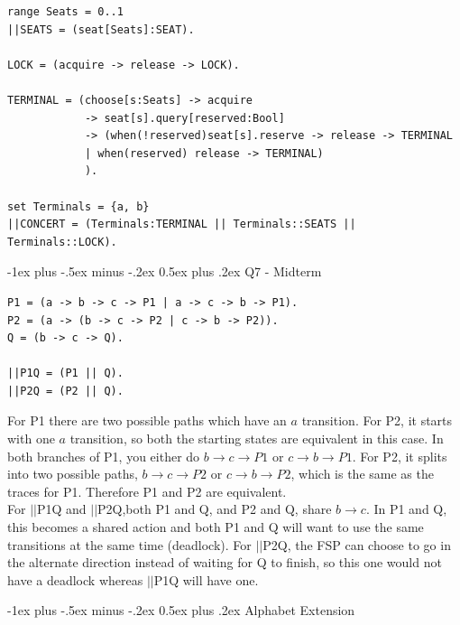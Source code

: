 \documentclass[letterpaper, 8pt]{extarticle}
\makeatletter
\renewcommand{\section}{\@startsection{section}{1}{0mm}%
                                {-1ex plus -.5ex minus -.2ex}%
                                {0.5ex plus .2ex}%
                                {\normalfont\normalsize\bfseries}}
\makeatother
\begin{document}
\begin{multicols*}{5}
\begin{lstlisting}
range Seats = 0..1
||SEATS = (seat[Seats]:SEAT).

LOCK = (acquire -> release -> LOCK).

TERMINAL = (choose[s:Seats] -> acquire
            -> seat[s].query[reserved:Bool]
            -> (when(!reserved)seat[s].reserve -> release -> TERMINAL
            | when(reserved) release -> TERMINAL)
            ).

set Terminals = {a, b}
||CONCERT = (Terminals:TERMINAL || Terminals::SEATS || Terminals::LOCK).
\end{lstlisting}

\section{Q7 - Midterm}
\begin{lstlisting}
P1 = (a -> b -> c -> P1 | a -> c -> b -> P1).
P2 = (a -> (b -> c -> P2 | c -> b -> P2)).
Q = (b -> c -> Q).

||P1Q = (P1 || Q).
||P2Q = (P2 || Q).
\end{lstlisting}
For P1 there are two possible paths which have an $a$ transition. For P2, it starts with one $a$ transition, so both the starting states are equivalent in this case. In both branches of P1, you either do $b \rightarrow c \rightarrow P1$  or $c \rightarrow b \rightarrow P1$. For P2, it splits into two possible paths, $b \rightarrow c \rightarrow P2$ or $c \rightarrow b \rightarrow P2$, which is the same as the traces for P1. Therefore P1 and P2 are equivalent. \\
For $||$P1Q and $||$P2Q,both P1 and Q, and P2 and Q, share $b \rightarrow c$. In P1 and Q, this becomes a shared action and both P1 and Q will want to use the same transitions at the same time (deadlock). For $||$P2Q, the FSP can choose to go in the alternate direction instead of waiting for Q to finish, so this one would not have a deadlock whereas $||$P1Q will have one.

\section{Alphabet Extension}

\end{multicols*}
\end{document}

